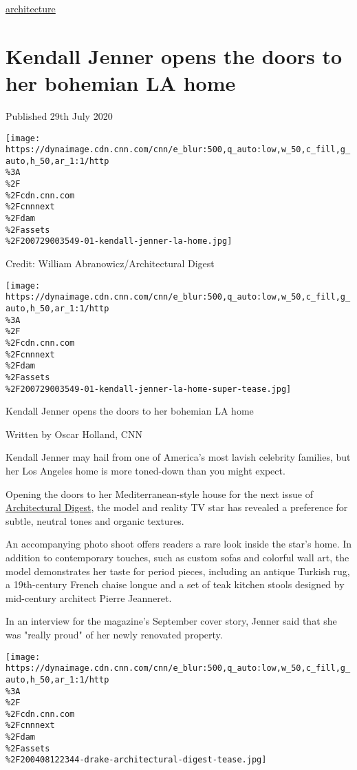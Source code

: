 \href{/}{}\href{/style}{}

\href{/style/architecture}{architecture}

\hypertarget{kendall-jenner-opens-the-doors-to-her-bohemian-la-home}{%
\section{Kendall Jenner opens the doors to her bohemian LA
home}\label{kendall-jenner-opens-the-doors-to-her-bohemian-la-home}}

Published 29th July 2020

\texttt{[image: https://dynaimage.cdn.cnn.com/cnn/e\_blur:500,q\_auto:low,w\_50,c\_fill,g\_auto,h\_50,ar\_1:1/http\\\%3A\\\%2F\\\%2Fcdn.cnn.com\\\%2Fcnnnext\\\%2Fdam\\\%2Fassets\\\%2F200729003549-01-kendall-jenner-la-home.jpg]}

Credit: William Abranowicz/Architectural Digest

\texttt{[image: https://dynaimage.cdn.cnn.com/cnn/e\_blur:500,q\_auto:low,w\_50,c\_fill,g\_auto,h\_50,ar\_1:1/http\\\%3A\\\%2F\\\%2Fcdn.cnn.com\\\%2Fcnnnext\\\%2Fdam\\\%2Fassets\\\%2F200729003549-01-kendall-jenner-la-home-super-tease.jpg]}

Kendall Jenner opens the doors to her bohemian LA home

Written by Oscar Holland, CNN

Kendall Jenner may hail from one of America's most lavish celebrity
families, but her Los Angeles home is more toned-down than you might
expect.

Opening the doors to her Mediterranean-style house for the next issue of
\href{https://www.architecturaldigest.com/story/kendall-jenner-los-angeles-home}{Architectural
Digest}, the model and reality TV star has revealed a preference for
subtle, neutral tones and organic textures.

An accompanying photo shoot offers readers a rare look inside the star's
home. In addition to contemporary touches, such as custom sofas and
colorful wall art, the model demonstrates her taste for period pieces,
including an antique Turkish rug, a 19th-century French chaise longue
and a set of teak kitchen stools designed by mid-century architect
Pierre Jeanneret.

In an interview for the magazine's September cover story, Jenner said
that she was "really proud" of her newly renovated property.

\href{/style/article/drake-mansion-toronto-architectural-digest/index.html}{}

\texttt{[image: https://dynaimage.cdn.cnn.com/cnn/e\_blur:500,q\_auto:low,w\_50,c\_fill,g\_auto,h\_50,ar\_1:1/http\\\%3A\\\%2F\\\%2Fcdn.cnn.com\\\%2Fcnnnext\\\%2Fdam\\\%2Fassets\\\%2F200408122344-drake-architectural-digest-tease.jpg]}

